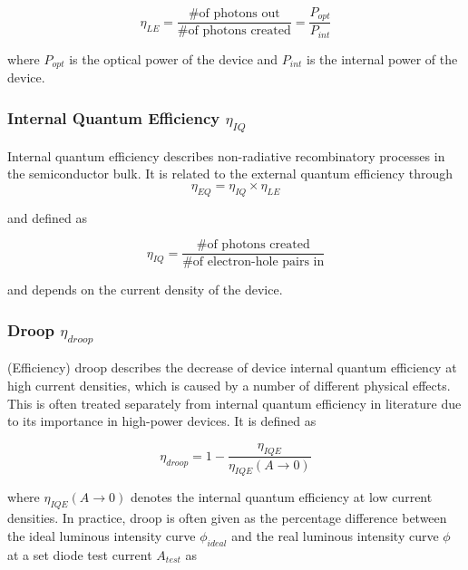 \documentclass[twoside,twocolumn,9pt]{article}
\begin{document}
\begin{equation}
    \eta_{LE}=\frac{\text{\# of photons out}}{\text{\# of photons created}} = \frac{P_{opt}}{P_{int}}
\end{equation}

where $P_{opt}$ is the optical power of the device and $P_{int}$ is the internal power of the device\cite{schubert2018light}\cite{tsao2010solid}.

\subsubsection{Internal Quantum Efficiency $\eta_{IQ}$}

Internal quantum efficiency describes non-radiative recombinatory processes in the semiconductor bulk. It is related to the external quantum efficiency through
\begin{equation}
\label{eqn:ieq-eqe}
    \eta_{EQ} = \eta_{IQ} \times \eta_{LE}
\end{equation}

and defined as

\begin{equation}
    \eta_{IQ} = \frac{\# \text{of photons created}}{\# \text{of electron-hole pairs in}}
\end{equation}

and depends on the current density of the device\cite{schubert2018light}\cite{tsao2010solid}. 

\subsubsection{Droop $\eta_{droop}$}

(Efficiency) droop describes the decrease of device internal quantum efficiency at high current densities, which is caused by a number of different physical effects\cite{David2020}. This is often treated separately from internal quantum efficiency in literature due to its importance in high-power devices. It is defined as

\begin{equation}
    \eta_{droop} = 1 - \frac{\eta_{IQE}}{\eta_{IQE}(A \rightarrow 0)}
\end{equation}

where $\eta_{IQE}(A \rightarrow 0)$ denotes the internal quantum efficiency at low current densities. In practice, droop is often given as the percentage difference between the ideal luminous intensity curve $\phi_{ideal}$ and the real luminous intensity curve $\phi$ at a set diode test current $A_{test}$ as
\end{document}
